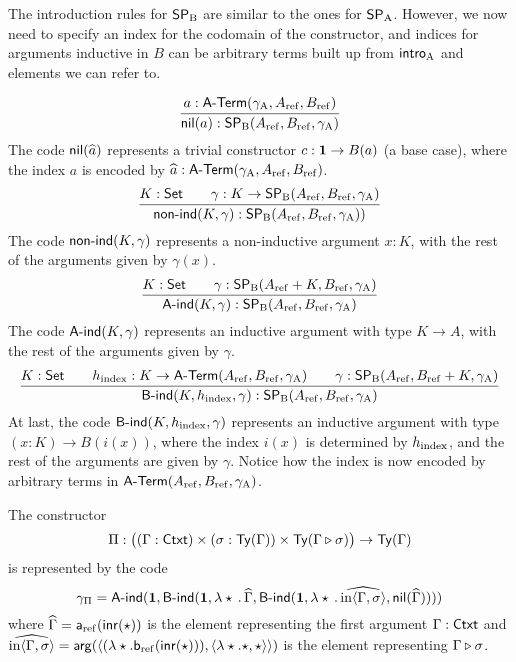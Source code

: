 \documentclass{article}
\begin{document}
The introduction rules for $\mathsf{SP}_{\mathrm{B}}$ are similar to the ones for $\mathsf{SP}_{\mathrm{A}}$.
However, we now need to specify an index for the codomain of the
constructor, and indices for arguments inductive in $B$ can be
arbitrary terms built up from $\mathsf{intro}_{\mathrm{A}}$ and elements we can refer to.

\[
\infer{\nilB(a) : \SPB(\Aref, \Bref, \gammaA)}{a : \Aterm(\gammaA, \Aref, \Bref)}
\]
%
The code $\mathsf{nil}(\widehat{a})$ represents a trivial constructor $c :
\mathbf{1} \to B(a)$ (a base case), where the index $a$ is encoded by
$\widehat{a} : \mathsf{A}\text{-}\mathsf{Term}(\gamma_{\mathrm{A}}, A_{\mathrm{ref}}, B_{\mathrm{ref}})$.
%
\[
\infer{\nonindB(K, \gamma) : \SPB(\Aref, \Bref, \gammaA))}{K : \Set & \quad \gamma : K \to \SPB(\Aref, \Bref, \gammaA)}
\]
%
The code $\mathsf{non}\text{-}\mathsf{ind}(K, \gamma)$ represents a non-inductive argument $x: K$, with the rest of the arguments given by $\gamma(x)$.
%
\[
\infer{\AindB(K, \gamma) : \SPB(\Aref, \Bref, \gammaA)}{K : \Set & \quad \gamma : \SPB(\Aref + K, \Bref, \gammaA)}
\]
%
The code $\mathsf{A}\text{-}\mathsf{ind}(K, \gamma)$ represents an inductive argument with
type $K \to A$, with the rest of the arguments given by
$\gamma$. %
%
\[
\infer{\BindB(K, \hindex, \gamma) : \SPB(\Aref, \Bref, \gammaA)}{K : \Set & \quad \hindex : K \to \Aterm(\Aref, \Bref, \gammaA) & \quad \gamma : \SPB(\Aref, \Bref + K, \gammaA)}
\]
%
At last, the code $\mathsf{B}\text{-}\mathsf{ind}(K, h_{\mathrm{index}}, \gamma)$ represents an inductive
argument with type $(x : K) \to B(i(x))$, where the index $i(x)$ is
determined by $h_{\mathrm{index}}$, and the rest of the arguments are given by
$\gamma$. Notice how the index is now encoded by arbitrary terms in
$\mathsf{A}\text{-}\mathsf{Term}(A_{\mathrm{ref}}, B_{\mathrm{ref}}, \gamma_{\mathrm{A}})$.
%
\begin{example}
  The constructor
  \[
  \Pi : \big((\Gamma : \mathsf{Ctxt}) \times (\sigma : \mathsf{Ty}(\Gamma)) \times \mathsf{Ty}(\Gamma \triangleright \sigma)\big)\to \mathsf{Ty}(\Gamma)
  \]
  is represented by the code
  \[
  \gamma_{\Pi} = \mathsf{A}\text{-}\mathsf{ind}(\mathbf{1},
                  \mathsf{B}\text{-}\mathsf{ind}(\mathbf{1}, \lambda \star\,.\,\widehat{\Gamma}, 
                    \mathsf{B}\text{-}\mathsf{ind}(\mathbf{1}, \lambda \star\,.\,\widehat{\text{in}\langle \Gamma , \sigma\rangle},
                      \mathsf{nil}(\widehat{\Gamma}))))
  \]
  where $\widehat{\Gamma} = \mathsf{a}_{\mathrm{ref}}(\mathsf{inr}(\star))$ is the element
  representing the first argument $\Gamma : \mathsf{Ctxt}$ and
  $\widehat{\text{in}\langle \Gamma , \sigma\rangle} = \mathsf{arg}(\langle
  (\lambda \star.\mathsf{b}_{\mathrm{ref}}(\mathsf{inr}(\star))), \langle \lambda
  \star.\star, \star\rangle\rangle)$ is the element representing
  $\Gamma \triangleright \sigma$. 

\hfill \blackqed
\end{example}
\end{document}
